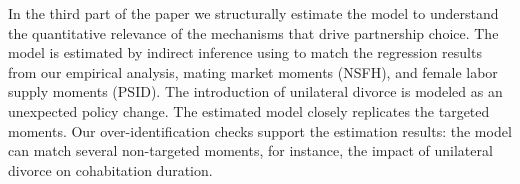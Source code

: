 \documentclass[12pt]{article}
\numberwithin{table}{section}
\begin{document}





In the third part of the paper we structurally estimate the model to understand the quantitative relevance of the mechanisms that drive partnership choice. The model is estimated by indirect inference using to match the regression results from our empirical analysis, mating market moments (NSFH), and female labor supply moments (PSID). The introduction of unilateral divorce is modeled as an unexpected policy change. The estimated model closely replicates the targeted moments. Our over-identification checks support the estimation results: the model can match several non-targeted moments, for instance, the impact of unilateral divorce on cohabitation duration.
\end{document}
